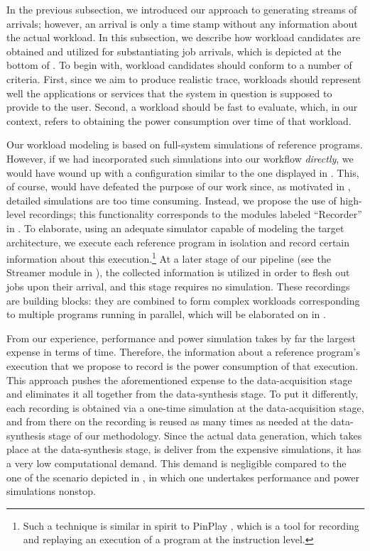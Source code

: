 In the previous subsection, we introduced our approach to generating streams of
arrivals; however, an arrival is only a time stamp without any information about
the actual workload. In this subsection, we describe how workload candidates are
obtained and utilized for substantiating job arrivals, which is depicted at the
bottom of . To begin with, workload candidates should conform
to a number of criteria. First, since we aim to produce realistic trace,
workloads should represent well the applications or services that the system in
question is supposed to provide to the user. Second, a workload should be fast
to evaluate, which, in our context, refers to obtaining the power consumption
over time of that workload.

Our workload modeling is based on full-system simulations of reference programs.
However, if we had incorporated such simulations into our workflow
\emph{directly}, we would have wound up with a configuration similar to the one
displayed in . This, of course, would have defeated the
purpose of our work since, as motivated in , detailed
simulations are too time consuming. Instead, we propose the use of high-level
recordings; this functionality corresponds to the modules labeled ``Recorder''
in . To elaborate, using an adequate simulator capable of
modeling the target architecture, we execute each reference program in isolation
and record certain information about this execution.\footnote{Such a technique
is similar in spirit to PinPlay \cite{patil2010}, which is a tool for recording
and replaying an execution of a program at the instruction level.} At a later
stage of our pipeline (see the Streamer module in ), the
collected information is utilized in order to flesh out jobs upon their arrival,
and this stage requires no simulation. These recordings are building blocks:
they are combined to form complex workloads corresponding to multiple programs
running in parallel, which will be elaborated on in .

From our experience, performance and power simulation takes by far the largest
expense in terms of time. Therefore, the information about a reference program's
execution that we propose to record is the power consumption of that execution.
This approach pushes the aforementioned expense to the data-acquisition stage
and eliminates it all together from the data-synthesis stage. To put it
differently, each recording is obtained via a one-time simulation at the
data-acquisition stage, and from there on the recording is reused as many times
as needed at the data-synthesis stage of our methodology. Since the actual data
generation, which takes place at the data-synthesis stage, is deliver from the
expensive simulations, it has a very low computational demand. This demand is
negligible compared to the one of the scenario depicted in ,
in which one undertakes performance and power simulations nonstop.

